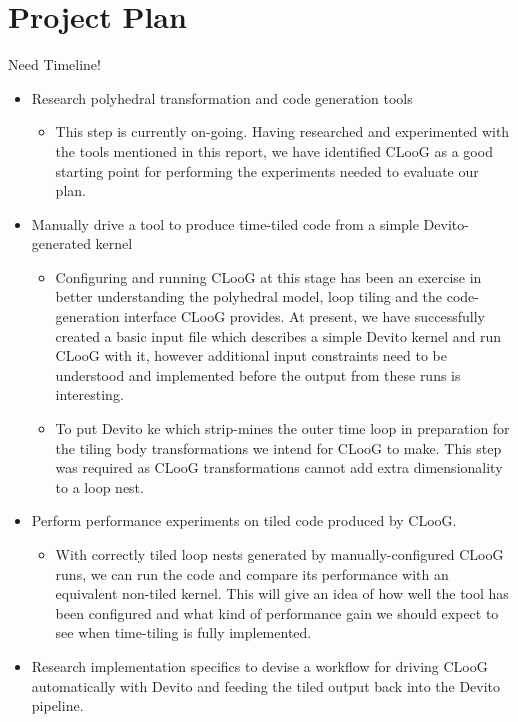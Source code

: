 \documentclass[a4paper,12pt,twoside]{report}
\begin{document}
\chapter{Project Plan}
Need Timeline!
\begin{itemize}
    \item Research polyhedral transformation and code generation tools
        \begin{itemize}
            \item This step is currently on-going. Having researched and experimented with the tools mentioned in
                this report, we have identified CLooG as a good starting point for performing the experiments needed
                to evaluate our plan.
        \end{itemize}
    \item Manually drive a tool to produce time-tiled code from a simple Devito-generated kernel
        \begin{itemize}
            \item Configuring and running CLooG at this stage has been an exercise in better understanding the polyhedral model,
                loop tiling and the code-generation interface CLooG provides. At present, we have successfully created a basic input file
                which describes a simple Devito kernel and run CLooG with it, however additional input constraints need to be understood and implemented
                before the output from these runs is interesting.
            \item To put Devito ke
                which strip-mines the outer time loop in preparation for the tiling body transformations we intend for CLooG to make. This step was required as CLooG
                transformations cannot add extra dimensionality to a loop nest.
        \end{itemize}
    \item Perform performance experiments on tiled code produced by CLooG.
        \begin{itemize}
            \item With correctly tiled loop nests generated by manually-configured CLooG runs, we can run the code and compare its performance with an equivalent 
                non-tiled kernel. This will give an idea of how well the tool has been configured and what kind of performance gain we should expect to see when
                time-tiling is fully implemented.
        \end{itemize}
    \item Research implementation specifics to devise a workflow for driving CLooG automatically with Devito and feeding the tiled output back into the Devito pipeline.

\end{itemize}
\end{document}
